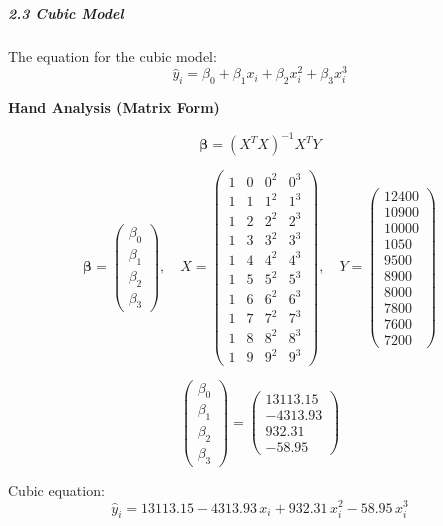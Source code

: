 \documentclass[12pt,a4paper]{article}
\begin{document}
\subparagraph{2.3 Cubic Model}

The equation for the cubic model:
\begin{equation}
  \hat{y}_i = \beta_0 + \beta_1 x_i + \beta_2 x_i^2 + \beta_3 x_i^3
\end{equation}

\textbf{Hand Analysis (Matrix Form)}

\[
\bm{\beta} = (X^T X)^{-1} X^T Y
\]

\[
\bm{\beta} = \begin{pmatrix}\beta_0\\\beta_1\\\beta_2\\\beta_3\end{pmatrix},\quad
X = \begin{pmatrix}1&0&0^2&0^3\\1&1&1^2&1^3\\1&2&2^2&2^3\\1&3&3^2&3^3\\1&4&4^2&4^3\\1&5&5^2&5^3\\1&6&6^2&6^3\\1&7&7^2&7^3\\1&8&8^2&8^3\\1&9&9^2&9^3\end{pmatrix},\quad
Y = \begin{pmatrix}12400\\10900\\10000\\1050\\9500\\8900\\8000\\7800\\7600\\7200\end{pmatrix}
\]

\[
\begin{pmatrix}\beta_0\\\beta_1\\\beta_2\\\beta_3\end{pmatrix} = \begin{pmatrix}13113.15\\-4313.93\\932.31\\-58.95\end{pmatrix}
\]

Cubic equation:
\begin{equation}
  \hat{y}_i = 13113.15 - 4313.93\,x_i + 932.31\,x_i^2 - 58.95\,x_i^3
\end{equation}
\end{document}
